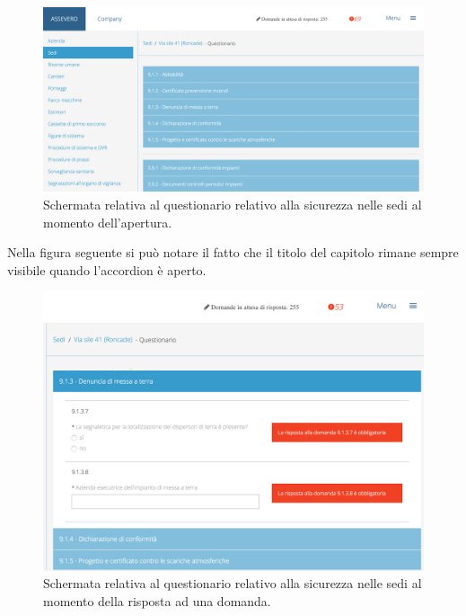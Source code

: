 \begin{figure}[H]
	\begin{center}
		\includegraphics[width=12.6cm]{Pics/ScreenQuestionarioSediApertura.png}
		\caption{Schermata relativa al questionario relativo alla sicurezza nelle sedi al momento dell'apertura.}
		\label{fig:ScreenQuestionarioSediApertura.png}
	\end{center}
\end{figure}
Nella figura seguente si può notare il fatto che il titolo del capitolo rimane sempre visibile quando l'accordion è aperto.\\
\begin{figure}[H]
	\begin{center}
		\includegraphics[width=12cm]{Pics/ScreenQuestionarioStickyHeader.png}
		\caption{Schermata relativa al questionario relativo alla sicurezza nelle sedi al momento della risposta ad una domanda.}
		\label{fig:ScreenQuestionarioStickyHeader.png}
	\end{center}
\end{figure}

 


\newpage
